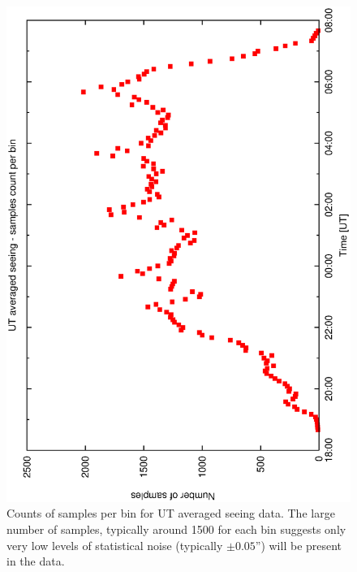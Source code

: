 {{\begin{figure}[htbp]
\begin{center}
    \includegraphics[scale=0.4, angle=-90]{figures/ecs/ut_bin_counts.eps}
\end{center} 
\caption[Counts of samples per bin for UT averaged seeing data.]
{Counts of samples per bin for UT averaged seeing data. The large number of samples, typically around 1500 for each bin suggests only very low levels of statistical noise (typically $\pm 0.05$'') will be present in the data.}
\label{fig:ut_bin_count}
\end{figure}




}}
